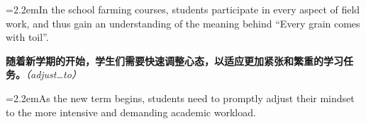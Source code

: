 \documentclass[11pt,a4paper]{article}
\newcommand{\num}[1]{\makebox[1.9em][r]{#1.}\hspace{0.3em}}
\newcommand{\prompt}[1]{\emph{\textcolor{tipblue}{\small（#1）}}}
\begin{document}
\vspace{0.15em}

\noindent\hangindent=2.2em\hspace{2.2em}In the school farming courses, students participate in every aspect of field work, and thus gain an understanding of the meaning behind “Every grain comes with toil”.

\num{5}\textbf{随着新学期的开始，学生们需要快速调整心态，以适应更加紧张和繁重的学习任务。}\prompt{adjust…to}

\vspace{0.15em}

\noindent\hangindent=2.2em\hspace{2.2em}As the new term begins, students need to promptly adjust their mindset to the more intensive and demanding academic workload.
\end{document}
